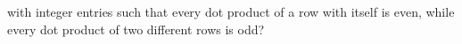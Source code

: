 with integer entries such that every dot product of a row with itself is
even, while every dot product of two different rows is odd?
